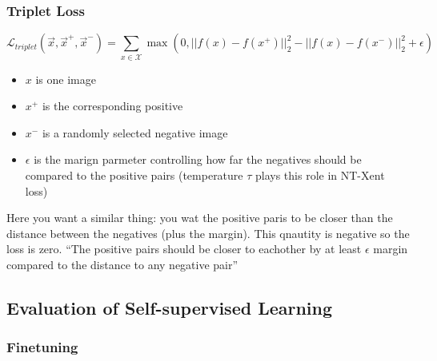 \documentclass[11pt]{article}
\begin{document}
\subsubsection{Triplet Loss}

\begin{equation}
    \mathcal L_{triplet}(\vec x, \vec x^+, \vec x^-)=\sum_{x\in \mathcal X}\max(0, ||f(x)-f(x^+)||^2_2 - ||f(x)-f(x^-)||^2_2+\epsilon)
\end{equation}

\begin{itemize}
    \item $x$ is one image
    \item $x^+$ is the corresponding positive
    \item $x^-$ is a randomly selected negative image
    \item $\epsilon$ is the marign parmeter controlling how far the negatives should be compared to the positive pairs (temperature $\tau$ plays this role in NT-Xent loss)
\end{itemize}

Here you want a similar thing: you wat the positive paris to be closer than the distance between the negatives (plus the margin). This qnautity is negative so the loss is zero. ``The positive pairs should be closer to eachother by at least $\epsilon$ margin compared to the distance to any negative pair''

\subsection{Evaluation of Self-supervised Learning}

\subsubsection{Finetuning}

\begin{figure}[H]
    \centering
    \caption*{}
\end{figure}
\end{document}
